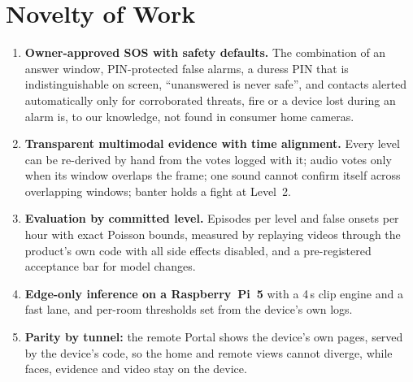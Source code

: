 \section{Novelty of Work}
\label{sec:novelty}
\begin{enumerate}
\item \textbf{Owner-approved SOS with safety defaults.} The combination of an answer window, PIN-protected false alarms, a duress PIN that is indistinguishable on screen, ``unanswered is never safe'', and contacts alerted automatically only for corroborated threats, fire or a device lost during an alarm is, to our knowledge, not found in consumer home cameras.
\item \textbf{Transparent multimodal evidence with time alignment.} Every level can be re-derived by hand from the votes logged with it; audio votes only when its window overlaps the frame; one sound cannot confirm itself across overlapping windows; banter holds a fight at Level~2.
\item \textbf{Evaluation by committed level.} Episodes per level and false onsets per hour with exact Poisson bounds, measured by replaying videos through the product's own code with all side effects disabled, and a pre-registered acceptance bar for model changes.
\item \textbf{Edge-only inference on a Raspberry~Pi~5} with a 4\,s clip engine and a fast lane, and per-room thresholds set from the device's own logs.
\item \textbf{Parity by tunnel:} the remote Portal shows the device's own pages, served by the device's code, so the home and remote views cannot diverge, while faces, evidence and video stay on the device.
\end{enumerate}
